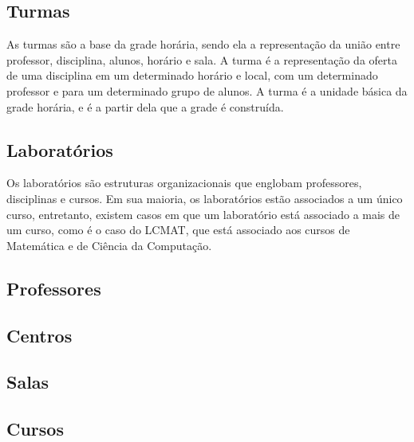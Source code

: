 \subsection{Turmas}

As turmas são a base da grade horária, sendo ela a representação da união entre professor, disciplina, alunos, horário e sala. A turma é a representação da oferta de uma disciplina em um determinado horário e local, com um determinado professor e para um determinado grupo de alunos. A turma é a unidade básica da grade horária, e é a partir dela que a grade é construída.

\subsection{Laboratórios}

Os laboratórios são estruturas organizacionais que englobam professores, disciplinas e cursos. Em sua maioria, os laboratórios estão associados a um único curso, entretanto, existem casos em que um laboratório está associado a mais de um curso, como é o caso do LCMAT, que está associado aos cursos de Matemática e de Ciência da Computação.


\subsection{Professores}


\subsection{Centros}

\subsection{Salas}

\subsection{Cursos}

